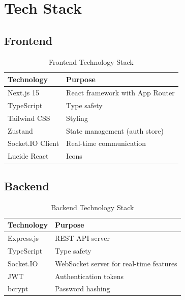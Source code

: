 \documentclass[12pt,a4paper]{article}
\begin{document}
\section{Tech Stack}

\subsection{Frontend}

\begin{table}[H]
\centering
\begin{tabularx}{\textwidth}{|l|X|}
\hline
\textbf{Technology} & \textbf{Purpose} \\
\hline
Next.js 15 & React framework with App Router \\
\hline
TypeScript & Type safety \\
\hline
Tailwind CSS & Styling \\
\hline
Zustand & State management (auth store) \\
\hline
Socket.IO Client & Real-time communication \\
\hline
Lucide React & Icons \\
\hline
\end{tabularx}
\caption{Frontend Technology Stack}
\end{table}

\subsection{Backend}

\begin{table}[H]
\centering
\begin{tabularx}{\textwidth}{|l|X|}
\hline
\textbf{Technology} & \textbf{Purpose} \\
\hline
Express.js & REST API server \\
\hline
TypeScript & Type safety \\
\hline
Socket.IO & WebSocket server for real-time features \\
\hline
JWT & Authentication tokens \\
\hline
bcrypt & Password hashing \\
\hline
\end{tabularx}
\caption{Backend Technology Stack}
\end{table}
\end{document}
